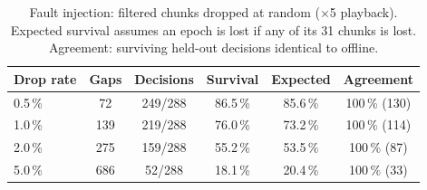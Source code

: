 \begin{table}[t]
\centering
\caption{Fault injection: filtered chunks dropped at random ($\times$5 playback). Expected survival assumes an epoch is lost if any of its 31 chunks is lost. Agreement: surviving held-out decisions identical to offline.}
\label{tab:loss}
\setlength{\tabcolsep}{3pt}
\footnotesize
\begin{tabular}{lccccc}
\toprule
Drop rate & Gaps & Decisions & Survival & Expected & Agreement \\
\midrule
0.5\,\% & 72 & 249/288 & 86.5\,\% & 85.6\,\% & 100\,\% (130) \\
1.0\,\% & 139 & 219/288 & 76.0\,\% & 73.2\,\% & 100\,\% (114) \\
2.0\,\% & 275 & 159/288 & 55.2\,\% & 53.5\,\% & 100\,\% (87) \\
5.0\,\% & 686 & 52/288 & 18.1\,\% & 20.4\,\% & 100\,\% (33) \\
\bottomrule
\end{tabular}
\end{table}
